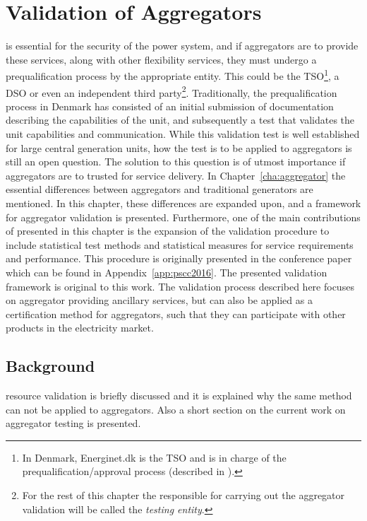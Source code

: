 \chapter{Validation of Aggregators}
\label{cha:validation}
 is essential for the security of the power system, and if aggregators are to provide these services, along with other flexibility services, they must undergo a prequalification process by the appropriate entity. This could be the TSO\footnote{In Denmark, Energinet.dk is the TSO and is in charge of the prequalification/approval process (described in \cite{EnerginetAncillary}).}, a DSO or even an independent third party\footnote{For the rest of this chapter the responsible for carrying out the aggregator validation will be called the \emph{testing entity}.}. Traditionally, the prequalification process in Denmark has consisted of an initial submission of documentation describing the capabilities of the unit, and subsequently a test that validates the unit capabilities and communication. While this validation test is well established for large central generation units, how the test is to be applied to aggregators is still an open question. The solution to this question is of utmost importance if aggregators are to trusted for service delivery. In Chapter~\ref{cha:aggregator} the essential differences between aggregators and traditional generators are mentioned. In this chapter, these differences are expanded upon, and a framework for aggregator validation is presented. Furthermore, one of the main contributions of presented in this chapter is the expansion of the validation procedure to include statistical test methods and statistical measures for service requirements and performance. This procedure is originally presented in the conference paper which can be found in Appendix~\ref{app:pscc2016}. The presented validation framework is original to this work. The validation process described here focuses on aggregator providing ancillary services, but can also be applied as a certification method for aggregators, such that they can participate with other products in the electricity market.

\section{Background}
 resource validation is briefly discussed and it is explained why the same method can not be applied to aggregators. Also a short section on the current work on aggregator testing is presented.
